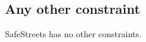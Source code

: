\documentclass[../../../rasd.tex]{subfiles}
\begin{document}
\subsection{Any other constraint\label{sect:3.4.3}}

SafeStreets has no other constraints. 
\end{document}
